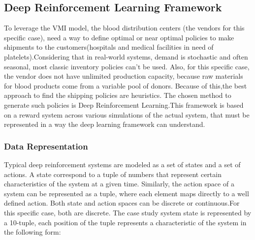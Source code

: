 \documentclass{elsarticle}
\begin{document}
	\subsection{Deep Reinforcement Learning Framework}
	
	To leverage the VMI model, the blood distribution centers (the vendors for this specific case), need a way to define optimal or near optimal policies to make shipments to the customers(hospitals and medical facilities in need of platelets).Considering that in real-world systems, demand is stochastic and often seasonal, most classic inventory policies can't be used. Also, for this specific case, the vendor does not have unlimited production capacity, because raw materials for blood products come from a variable pool of donors. Because of this,the best approach to find the shipping policies are heuristics. The chosen method to generate such policies is Deep Reinforcement Learning.This framework is based on a reward system across various simulations of the actual system, that must be represented in a way the deep learning framework can understand.
	
	\subsubsection{Data Representation}
	Typical deep reinforcement systems are modeled as a set of states and a set of actions. A state correspond to a tuple of numbers that represent certain characteristics of the system at a given time. Similarly, the action space of a system can be represented as a tuple, where each element maps directly to a well defined action. Both state and action spaces can be discrete or continuous.For this specific case, both are discrete.
	The case study system state is represented by a 10-tuple, each position of the tuple represents a characteristic of the system in the following form:
	
\end{document}
